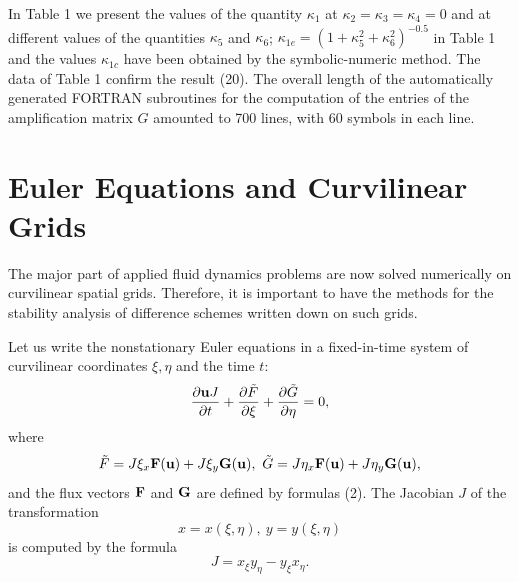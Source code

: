    In Table 1 we present the values of the quantity $\kappa_1$ at $\kappa_2=
\kappa_3=\kappa_4=0$ and at different values of the quantities $\kappa_5$
and $\kappa_6$; $\kappa_{1e}=(1+\kappa_5^2+\kappa_6^2)^{-0.5}$ in Table 1 and
the values $\kappa_{1c}$ have been obtained by the symbolic-numeric method. The
data of Table 1 confirm the result (20). The overall length of the
automatically generated FORTRAN subroutines for the computation of the entries
of the amplification matrix $G$ amounted to 700 lines, with 60 symbols in each
line.

\section{Euler Equations and Curvilinear Grids}
\hspace{6mm}

    The major part of applied fluid dynamics problems are now solved
numerically on curvilinear spatial grids. Therefore, it is important to have
the methods for the stability analysis of difference schemes written down on
such grids.

   Let us write the nonstationary Euler equations in a fixed-in-time system
of curvilinear coordinates $\xi,\eta$ and the time $t$:
\begin{equation}
\frac{\partial {\bf u}J}{\partial t} + \frac{\partial \tilde{F}}{\partial \xi}
+ \frac{\partial \tilde{G}}{\partial \eta}=0,
\end{equation}
where
\begin{equation}
\tilde{F}=J\xi_x{\bf F}({\bf u}) + J\xi_y{\bf G}({\bf u}),
~\tilde{G}=J\eta_x{\bf F}({\bf u}) + J\eta_y{\bf G}({\bf u}),
\end{equation}
and the flux vectors ${\bf F}$ and ${\bf G}$ are defined by formulas (2). The
Jacobian $J$ of the transformation
\begin{equation}
x=x(\xi,\eta),~y=y(\xi,\eta)
\end{equation}
is computed by the formula
\begin{equation}
J=x_\xi y_\eta-y_\xi x_\eta.
\end{equation}

